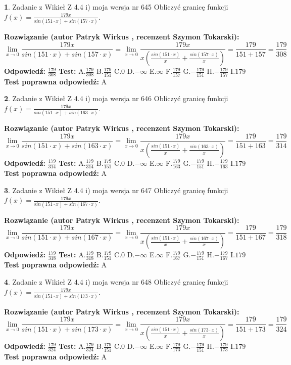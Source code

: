 \documentclass[12pt, a4paper]{article}
\theoremstyle{definition} %
\newtheorem{zad}{}
\newcommand{\zadStart}[1]{\begin{zad}#1\newline}
\newcommand{\zadStop}{\end{zad}}
\newcommand{\rozwStart}[2]{\noindent \textbf{Rozwiązanie (autor #1 , recenzent #2): }\newline}
\newcommand{\rozwStop}{\newline}
\newcommand{\odpStart}{\noindent \textbf{Odpowiedź:}\newline}
\newcommand{\odpStop}{\newline}
\newcommand{\testStart}{\noindent \textbf{Test:}\newline}
\newcommand{\testStop}{\newline}
\newcommand{\kluczStart}{\noindent \textbf{Test poprawna odpowiedź:}\newline}
\newcommand{\kluczStop}{\newline}
\begin{document}
\zadStart{Zadanie z Wikieł Z 4.4 i) moja wersja nr 645}
Obliczyć granicę funkcji $f(x)=\frac{179x}{sin(151\cdot x) +sin(157\cdot x)}$.
\zadStop
\rozwStart{Patryk Wirkus}{Szymon Tokarski}
$$\lim\limits_{x\to 0}\frac{179x}{sin(151\cdot x) +sin(157\cdot x)}=\lim\limits_{x\to 0}\frac{179x}{x(\frac{sin(151\cdot x)}{x}+\frac{sin(157\cdot x)}{x})}=\frac{179}{151+157} = \frac{179}{308}$$
\rozwStop
\odpStart
$\frac{179}{308}$
\odpStop
\testStart
A.$\frac{179}{308}$
B.$\frac{179}{151}$
C.$0$
D.$-\infty$
E.$\infty$
F.$\frac{179}{157}$
G.$-\frac{179}{151}$
H.$-\frac{179}{157}$
I.$179$
\testStop
\kluczStart
A
\kluczStop



\zadStart{Zadanie z Wikieł Z 4.4 i) moja wersja nr 646}
Obliczyć granicę funkcji $f(x)=\frac{179x}{sin(151\cdot x) +sin(163\cdot x)}$.
\zadStop
\rozwStart{Patryk Wirkus}{Szymon Tokarski}
$$\lim\limits_{x\to 0}\frac{179x}{sin(151\cdot x) +sin(163\cdot x)}=\lim\limits_{x\to 0}\frac{179x}{x(\frac{sin(151\cdot x)}{x}+\frac{sin(163\cdot x)}{x})}=\frac{179}{151+163} = \frac{179}{314}$$
\rozwStop
\odpStart
$\frac{179}{314}$
\odpStop
\testStart
A.$\frac{179}{314}$
B.$\frac{179}{151}$
C.$0$
D.$-\infty$
E.$\infty$
F.$\frac{179}{163}$
G.$-\frac{179}{151}$
H.$-\frac{179}{163}$
I.$179$
\testStop
\kluczStart
A
\kluczStop



\zadStart{Zadanie z Wikieł Z 4.4 i) moja wersja nr 647}
Obliczyć granicę funkcji $f(x)=\frac{179x}{sin(151\cdot x) +sin(167\cdot x)}$.
\zadStop
\rozwStart{Patryk Wirkus}{Szymon Tokarski}
$$\lim\limits_{x\to 0}\frac{179x}{sin(151\cdot x) +sin(167\cdot x)}=\lim\limits_{x\to 0}\frac{179x}{x(\frac{sin(151\cdot x)}{x}+\frac{sin(167\cdot x)}{x})}=\frac{179}{151+167} = \frac{179}{318}$$
\rozwStop
\odpStart
$\frac{179}{318}$
\odpStop
\testStart
A.$\frac{179}{318}$
B.$\frac{179}{151}$
C.$0$
D.$-\infty$
E.$\infty$
F.$\frac{179}{167}$
G.$-\frac{179}{151}$
H.$-\frac{179}{167}$
I.$179$
\testStop
\kluczStart
A
\kluczStop



\zadStart{Zadanie z Wikieł Z 4.4 i) moja wersja nr 648}
Obliczyć granicę funkcji $f(x)=\frac{179x}{sin(151\cdot x) +sin(173\cdot x)}$.
\zadStop
\rozwStart{Patryk Wirkus}{Szymon Tokarski}
$$\lim\limits_{x\to 0}\frac{179x}{sin(151\cdot x) +sin(173\cdot x)}=\lim\limits_{x\to 0}\frac{179x}{x(\frac{sin(151\cdot x)}{x}+\frac{sin(173\cdot x)}{x})}=\frac{179}{151+173} = \frac{179}{324}$$
\rozwStop
\odpStart
$\frac{179}{324}$
\odpStop
\testStart
A.$\frac{179}{324}$
B.$\frac{179}{151}$
C.$0$
D.$-\infty$
E.$\infty$
F.$\frac{179}{173}$
G.$-\frac{179}{151}$
H.$-\frac{179}{173}$
I.$179$
\testStop
\kluczStart
A
\kluczStop
\end{document}
